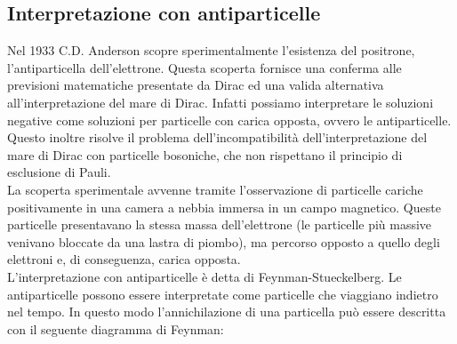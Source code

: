 \subsection{Interpretazione con antiparticelle}
Nel 1933 C.D. Anderson scopre sperimentalmente l'esistenza del positrone, l'antiparticella dell'elettrone. Questa scoperta fornisce una conferma alle previsioni matematiche presentate da Dirac ed una valida alternativa all'interpretazione del mare di Dirac. Infatti possiamo interpretare le soluzioni negative come soluzioni per particelle con carica opposta, ovvero le antiparticelle.\\
Questo inoltre risolve il problema dell'incompatibilità dell'interpretazione del mare di Dirac con particelle bosoniche, che non rispettano il principio di esclusione di Pauli.\\
La scoperta sperimentale avvenne tramite l'osservazione di particelle cariche positivamente in una camera a nebbia immersa in un campo magnetico. Queste particelle presentavano la stessa massa dell'elettrone (le particelle più massive venivano bloccate da una lastra di piombo), ma percorso opposto a quello degli elettroni e, di conseguenza, carica opposta.\\
L'interpretazione con antiparticelle è detta di Feynman-Stueckelberg. Le antiparticelle possono essere interpretate come particelle che viaggiano indietro nel tempo. In questo modo l'annichilazione di una particella può essere descritta con il seguente diagramma di Feynman:


